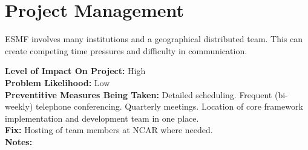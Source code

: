\documentclass[english]{article}
\newcommand{\req}[1]{\section{\hspace{.2in}#1}}
\newenvironment
{reqlist}
{\begin{list} {} {} \rm \item[]}
{\end{list}}
\begin{document}
\req{Project Management}
ESMF involves many institutions and a geographical distributed team. 
This can create competing time pressures and difficulty in communication.
\begin{reqlist}
{\bf Level of Impact On Project:} High \\
{\bf Problem Likelihood:} Low \\
{\bf Preventitive Measures Being Taken:} Detailed scheduling. Frequent (bi-weekly) telephone
conferencing. Quarterly meetings. Location of core framework implementation and development
team in one place.
\\
{\bf Fix:} Hosting of team members at NCAR where needed.\\
{\bf Notes:} 
\end{reqlist}
\end{document}
